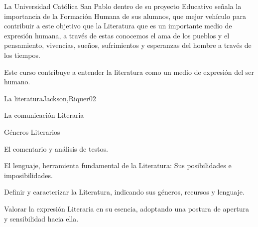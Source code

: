 \begin{syllabus}


\begin{justification}
La Universidad Católica San Pablo dentro de su proyecto Educativo señala la importancia de la Formación Humana de sus alumnos, que mejor vehículo para contribuir a este objetivo que la Literatura que es un importante medio de expresión humana, a través de estas  conocemos el ama de los pueblos y el pensamiento, vivencias, sueños, sufrimientos y esperanzas del hombre a través de los tiempos.
\end{justification}

\begin{goals}
\item Este curso contribuye a entender la literatura como un medio de expresión del ser humano.
\end{goals}

\begin{outcomes}
\end{outcomes}

\begin{unit}{La literatura}{Jackson,Riquer}{0}{2}
\begin{topics}
	\item La comunicación Literaria
	\item Géneros Literarios
	\item El comentario y análisis de testos.
	\item El lenguaje, herramienta fundamental de la Literatura: Sus posibilidades e imposibilidades.
\end{topics}
\begin{unitgoals}
	\item Definir y caracterizar la Literatura, indicando sus géneros, recursos y lenguaje.
	\item Valorar la expresión Literaria en su esencia, adoptando una postura de apertura y sensibilidad hacia ella.
\end{unitgoals}
\end{unit}


\end{syllabus}
